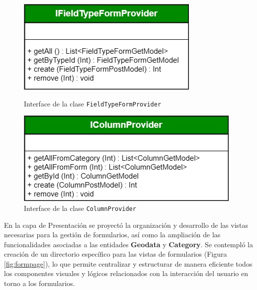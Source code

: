\documentclass[12pt, a4paper]{book}
\begin{document}
\begin{figure}[H]
  \centering
  \begin{minipage}[b]{0.43\textwidth}
    \centering
    \includegraphics[width=\textwidth]{images/form_provider.jpg}
    \caption{Interface de la clase \texttt{FieldTypeFormProvider}}
    \label{fig:iformprovider}
  \end{minipage}
  \hspace{0.02\textwidth}
  \begin{minipage}[b]{0.47\textwidth}
    \centering
    \includegraphics[width=\textwidth]{images/column_provider.jpg}
    \caption{Interface de la clase \texttt{ColumnProvider}}
    \label{fig:icolumnprovider}
  \end{minipage}
\end{figure}

En la capa de Presentación se proyectó la organización y desarrollo de las vistas necesarias para la gestión de formularios, así como la ampliación de las funcionalidades asociadas a las entidades \textbf{Geodata} y \textbf{Category}. Se contempló la creación de un directorio específico para las vistas de formularios (Figura \ref{fig:formpage}), lo que permite centralizar y estructurar de manera eficiente todos los componentes visuales y lógicos relacionados con la interacción del usuario en torno a los formularios.
\end{document}
